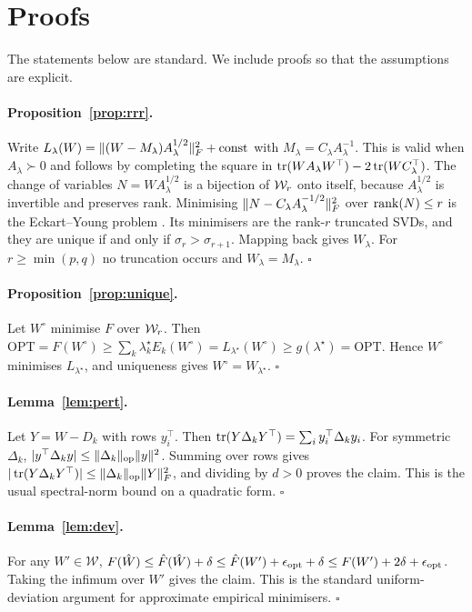 \section{Proofs}
\label{app:proofs}

The statements below are standard. We include proofs so that the assumptions are explicit.

\paragraph{Proposition~\ref{prop:rrr}.} Write $L_\lambda(W)=\lVert (W-M_\lambda)A_\lambda^{1/2}\rVert_{F}^2
+\mathrm{const}$ with $M_\lambda=C_\lambda A_\lambda^{-1}$. This is valid when $A_\lambda\succ0$
and follows by completing the square in $\operatorname{tr}(WA_\lambda W^\top)-2\operatorname{tr}(WC_\lambda^\top)$. The
change of variables $N=WA_\lambda^{1/2}$ is a bijection of $\mathcal{W}_r$ onto itself, because
$A_\lambda^{1/2}$ is invertible and preserves rank. Minimising $\lVert N-C_\lambda
A_\lambda^{-1/2}\rVert_{F}^2$ over $\operatorname{rank}(N)\le r$ is the Eckart--Young problem
\citep{eckart1936approximation}. Its minimisers are the rank-$r$ truncated SVDs, and they are
unique if and only if $\sigma_r>\sigma_{r+1}$. Mapping back gives $W_\lambda$. For
$r\ge\min(p,q)$ no truncation occurs and $W_\lambda=M_\lambda$. \hfill$\square$

\paragraph{Proposition~\ref{prop:unique}.} Let $W^\circ$ minimise $F$ over $\mathcal{W}_r$. Then
$\mathrm{OPT}=F(W^\circ)\ge\sum_k\lambda^\star_kE_k(W^\circ)=L_{\lambda^\star}(W^\circ)\ge
g(\lambda^\star)=\mathrm{OPT}$. Hence $W^\circ$ minimises $L_{\lambda^\star}$, and uniqueness gives
$W^\circ=W_{\lambda^\star}$. \hfill$\square$

\paragraph{Lemma~\ref{lem:pert}.} Let $Y=W-D_k$ with rows $y_i^\top$. Then
$\operatorname{tr}(Y\Delta_kY^\top)=\sum_iy_i^\top\Delta_ky_i$. For symmetric $\Delta_k$,
$|y^\top\Delta_ky|\le\lVert \Delta_k\rVert_{\mathrm{op}}\|y\|^2$. Summing over rows gives
$|\operatorname{tr}(Y\Delta_kY^\top)|\le\lVert \Delta_k\rVert_{\mathrm{op}}\lVert Y\rVert_{F}^2$, and dividing by $d>0$ proves the claim.
This is the usual spectral-norm bound on a quadratic form. \hfill$\square$

\paragraph{Lemma~\ref{lem:dev}.} For any $W'\in\mathcal W$,
$F(\hat{W})\le\hat{F}(\hat{W})+\delta\le\hat{F}(W')+\epsilon_{\mathrm{opt}}+\delta\le
F(W')+2\delta+\epsilon_{\mathrm{opt}}$. Taking the infimum over $W'$ gives the claim. This is the
standard uniform-deviation argument for approximate empirical minimisers. \hfill$\square$


